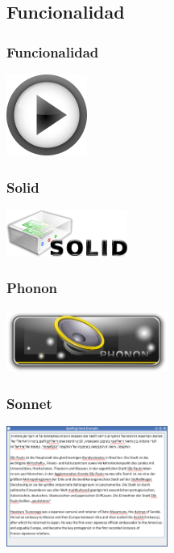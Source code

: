 \documentclass[12pt]{beamer}
\begin{document}
\subsection{Funcionalidad}
\begin {frame}
\frametitle{Funcionalidad}

\begin{center}
	\includegraphics[width=100px]{imatges/function.png}
\end{center}
\end {frame}


\begin {frame}
\frametitle{Solid}
\begin{center}
\includegraphics[width=150px]{imatges/solid.png}
\end{center}
\end {frame}

\begin {frame}
\frametitle{Phonon}
\begin{center}
\includegraphics[width=200px]{imatges/phonon.png}
\end{center}
\end {frame}

\begin {frame}
\frametitle{Sonnet}
\begin{center}
\includegraphics[width=200px]{imatges/sonnet.png}
\end{center}
\end {frame}
\end{document}
